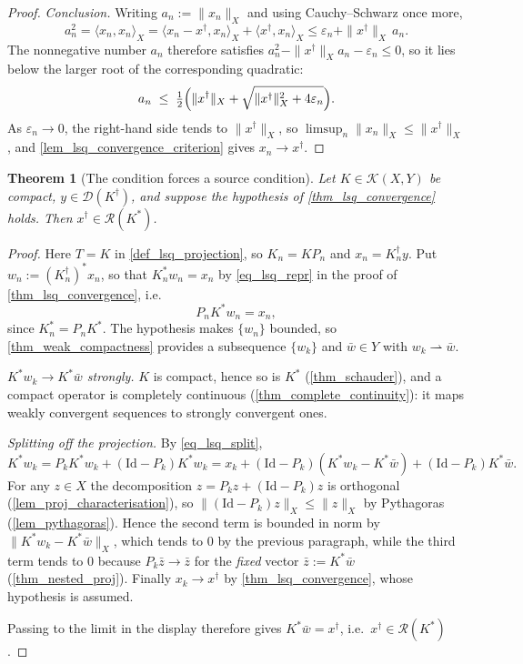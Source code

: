 \documentclass[a4paper]{report}
\theoremstyle{plain}
\newtheorem{theorem}{Theorem}[chapter]
\theoremstyle{definition}
\theoremstyle{remark}
\newcommand{\Kk}{\mathcal{K}}
\newcommand{\Ran}{\mathcal{R}}
\newcommand{\Dom}{\mathcal{D}}
\newcommand{\Id}{\mathrm{Id}}
\newcommand{\dg}{^{\dagger}}
\newcommand{\wc}{\rightharpoonup}
\begin{document}
\begin{proof}
  \emph{Conclusion.}  Writing $a_n := \|x_n\|_X$ and using Cauchy--Schwarz once more,
  \[
    a_n^{2} = \langle x_n, x_n\rangle_X
      = \langle x_n - x\dg, x_n\rangle_X + \langle x\dg, x_n\rangle_X
      \le \varepsilon_n + \|x\dg\|_X\,a_n .
  \]
  The nonnegative number $a_n$ therefore satisfies
  $a_n^{2} - \|x\dg\|_Xa_n - \varepsilon_n \le 0$, so it lies below the larger root of the
  corresponding quadratic:
  \[
    a_n \;\le\; \tfrac12\Bigl(\|x\dg\|_X
      + \sqrt{\|x\dg\|_X^{2} + 4\varepsilon_n}\Bigr) .
  \]
  As $\varepsilon_n \to 0$, the right-hand side tends to $\|x\dg\|_X$, so
  $\limsup_n\|x_n\|_X \le \|x\dg\|_X$, and \cref{lem_lsq_convergence_criterion} gives
  $x_n \to x\dg$.
\end{proof}


\begin{theorem}[The condition forces a source condition]
  \label{thm_lsq_source_necessary}
  Let $K \in \Kk(X,Y)$ be compact, $y \in \Dom(K\dg)$, and suppose the hypothesis of
  \cref{thm_lsq_convergence} holds.  Then $x\dg \in \Ran(K^{*})$.
\end{theorem}

\begin{proof}
  Here $T = K$ in \cref{def_lsq_projection}, so $K_n = KP_n$ and $x_n = K_n\dg y$.  Put
  $w_n := (K_n\dg)^{*}x_n$, so that $K_n^{*}w_n = x_n$ by \eqref{eq_lsq_repr} in the
  proof of \cref{thm_lsq_convergence}, i.e.
  \begin{equation}\label{eq_lsq_split}
    P_nK^{*}w_n = x_n ,
  \end{equation}
  since $K_n^{*} = P_nK^{*}$.  The hypothesis makes $\{w_n\}$ bounded, so
  \cref{thm_weak_compactness} provides a subsequence $\{w_k\}$ and $\bar{w} \in Y$ with
  $w_k \wc \bar{w}$.

  \emph{$K^{*}w_k \to K^{*}\bar{w}$ strongly.}  $K$ is compact, hence so is $K^{*}$
  (\cref{thm_schauder}), and a compact operator is completely continuous
  (\cref{thm_complete_continuity}): it maps weakly convergent sequences to strongly
  convergent ones.

  \emph{Splitting off the projection.}  By \eqref{eq_lsq_split},
  \[
    K^{*}w_k = P_kK^{*}w_k + (\Id - P_k)K^{*}w_k
      = x_k + (\Id - P_k)(K^{*}w_k - K^{*}\bar{w}) + (\Id - P_k)K^{*}\bar{w} .
  \]
  For any $z \in X$ the decomposition $z = P_kz + (\Id - P_k)z$ is orthogonal
  (\cref{lem_proj_characterisation}), so $\|(\Id - P_k)z\|_X \le \|z\|_X$ by Pythagoras
  (\cref{lem_pythagoras}).  Hence the second term is bounded in norm by
  $\|K^{*}w_k - K^{*}\bar{w}\|_X$, which tends to $0$ by the previous paragraph, while the
  third term tends to $0$ because $P_k\bar{z} \to \bar{z}$ for the \emph{fixed} vector
  $\bar{z} := K^{*}\bar{w}$ (\cref{thm_nested_proj}).  Finally $x_k \to x\dg$ by
  \cref{thm_lsq_convergence}, whose hypothesis is assumed.

  Passing to the limit in the display therefore gives $K^{*}\bar{w} = x\dg$, i.e.\
  $x\dg \in \Ran(K^{*})$.
\end{proof}
\end{document}
